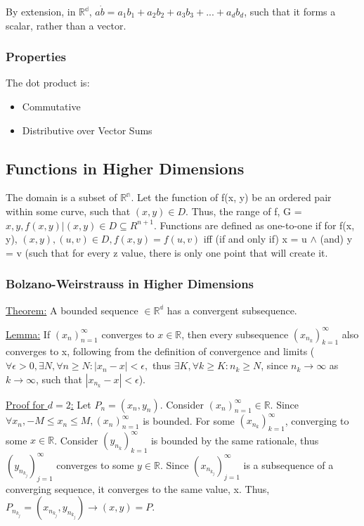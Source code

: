 By extension, in $\mathbb{R^d}$, $a \dot b = a_1b_1 + a_2b_2 + a_3b_3 +...+ a_db_d$, such that it forms a scalar, rather than a vector.

\subsubsection{Properties}
The dot product is:
\begin{itemize}
\item Commutative
\item Distributive over Vector Sums
\end{itemize}

\subsection{Functions in Higher Dimensions}
The domain is a subset of $\mathbb{R^n}$.
Let the function of f(x, y) be an ordered pair within some curve, such that $(x, y) \in D$. Thus, the range of f, G = ${x, y, f(x,y) | (x, y) \in D} \subseteq{R^{n+1}}$.
Functions are defined as one-to-one if for f(x, y), $(x, y), (u, v) \in D, f(x, y) = f(u, v)$ iff (if and only if) x = u $\wedge$ (and) y = v (such that for every z value, there is only one point that will create it.

\subsubsection{Bolzano-Weirstrauss in Higher Dimensions}
\underline{Theorem:} A bounded sequence $\in \mathbb{R^d}$ has a convergent subsequence.

\underline{Lemma:} If $(x_n)_{n=1}^\infty$ converges to $x \in \mathbb{R}$, then every subsequence $(x_{n_k})_{k=1}^\infty$ also converges to x, following from the definition of convergence and limits ($\forall \epsilon > 0, \exists N, \forall n \geq N: |x_n - x| < \epsilon,$ thus $\exists K, \forall k \geq K: n_k \geq N$, since $n_k \to \infty$ as $k \to \infty$, such that $|x_{n_k} - x| < \epsilon$).

\underline{Proof for $d = 2$:} Let $P_n = (x_n, y_n)$. Consider $(x_n)_{n=1}^\infty \in \mathbb{R}$. Since $\forall x_n, -M \leq x_n \leq M, (x_n)_{n=1}^\infty$ is bounded. For some $(x_{n_k})_{k=1}^\infty$, converging to some $x \in \mathbb{R}$. Consider $(y_{n_k})_{k=1}^\infty$ is bounded by the same rationale, thus $(y_{n_{k_j}})^\infty_{j=1}$ converges to some $y \in \mathbb{R}$. Since $(x_{n_{k_j}})_{j=1}^\infty$ is a subsequence of a converging sequence, it converges to the same value, x. Thus, $P_{n_{k_j}} = (x_{n_{k_j}}, y_{n_{k_j}}) \to (x, y) = P$.

